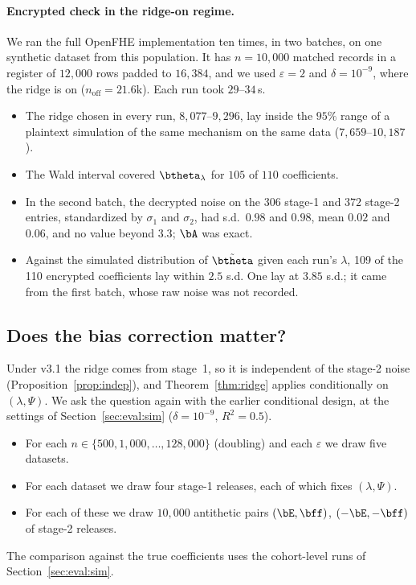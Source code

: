 \paragraph{Encrypted check in the ridge-on regime.} We ran the full OpenFHE implementation ten times, in two batches, on one synthetic dataset from this population. It has $n = 10{,}000$ matched records in a register of $12{,}000$ rows padded to $16{,}384$, and we used $\varepsilon = 2$ and $\delta = 10^{-9}$, where the ridge is on ($n_{\mathrm{off}} = 21.6$k). Each run took $29$--$34$\,s.
\begin{itemize}[noitemsep]
  \item The ridge chosen in every run, $8{,}077$--$9{,}296$, lay inside the $95\%$ range of a plaintext simulation of the same mechanism on the same data ($7{,}659$--$10{,}187$).
  \item The Wald interval covered $\btheta_\lambda$ for $105$ of $110$ coefficients.
  \item In the second batch, the decrypted noise on the $306$ stage-1 and $372$ stage-2 entries, standardized by $\sigma_1$ and $\sigma_2$, had s.d.\ $0.98$ and $0.98$, mean $0.02$ and $0.06$, and no value beyond $3.3$; $\bA$ was exact.
  \item Against the simulated distribution of $\tilde\btheta$ given each run's $\lambda$, 109 of the 110 encrypted coefficients lay within $2.5$ s.d. One lay at $3.85$ s.d.; it came from the first batch, whose raw noise was not recorded.
\end{itemize}


\subsection{Does the bias correction matter?}
\label{sec:eval:bias}

Under v3.1 the ridge comes from stage~1, so it is independent of the stage-2 noise (Proposition~\ref{prop:indep}), and Theorem~\ref{thm:ridge} applies conditionally on $(\lambda, \Psi)$. We ask the question again with the earlier conditional design, at the settings of Section~\ref{sec:eval:sim} ($\delta = 10^{-9}$, $R^2 = 0.5$).
\begin{itemize}[noitemsep]
  \item For each $n \in \{500, 1{,}000, \dots, 128{,}000\}$ (doubling) and each $\varepsilon$ we draw five datasets.
  \item For each dataset we draw four stage-1 releases, each of which fixes $(\lambda, \Psi)$.
  \item For each of these we draw $10{,}000$ antithetic pairs $(\bE, \bff)$, $(-\bE, -\bff)$ of stage-2 releases.
\end{itemize}
The comparison against the true coefficients uses the cohort-level runs of Section~\ref{sec:eval:sim}.

